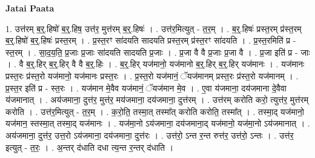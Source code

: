 \documentclass[17pt]{extarticle}
\begin{document}
\textbf{Jatai Paata} \newline

1. उत्त॑रम् ब॒र्॒.हिषो॑ ब॒र्॒.हिष॒ उत्त॑र॒ मुत्त॑रम् ब॒र्॒.हिषः॑ । . उत्त॑र॒मित्युत् - त॒र॒म् । . ब॒र्॒.हिषः॑ प्रस्त॒रम् प्र॑स्त॒रम् ब॒र्॒.हिषो॑ ब॒र्॒.हिषः॑ प्रस्त॒रम् । . प्र॒स्त॒रꣳ सा॑दयति सादयति प्रस्त॒रम् प्र॑स्त॒रꣳ सा॑दयति । . प्र॒स्त॒रमिति॑ प्र - स्त॒रम् । . सा॒द॒य॒ति॒ प्र॒जाः प्र॒जाः सा॑दयति सादयति प्र॒जाः । . प्र॒जा वै वै प्र॒जाः प्र॒जा वै । . प्र॒जा इति॑ प्र - जाः । . वै ब॒र्॒.हिर् ब॒र्॒.हिर् वै वै ब॒र्॒.हिः । . ब॒र्॒.हिर् यज॑मानो॒ यज॑मानो ब॒र्॒.हिर् ब॒र्॒.हिर् यज॑मानः । . यज॑मानः प्रस्त॒रः प्र॑स्त॒रो यज॑मानो॒ यज॑मानः प्रस्त॒रः । . प्र॒स्त॒रो यज॑मानं॒ ॅयज॑मानम् प्रस्त॒रः प्र॑स्त॒रो यज॑मानम् । . प्र॒स्त॒र इति॑ प्र - स्त॒रः । . यज॑मान मे॒वैव यज॑मानं॒ ॅयज॑मान मे॒व । . ए॒वा य॑जमाना॒ दय॑जमाना दे॒वैवा य॑जमानात् । . अय॑जमाना॒ दुत्त॑र॒ मुत्त॑र॒ मय॑जमाना॒ दय॑जमाना॒ दुत्त॑रम् । . उत्त॑रम् करोति करो॒ त्युत्त॑र॒ मुत्त॑रम् करोति । . उत्त॑र॒मित्युत् - त॒र॒म् । . क॒रो॒ति॒ तस्मा॒त् तस्मा᳚त् करोति करोति॒ तस्मा᳚त् । . तस्मा॒द् यज॑मानो॒ यज॑मान॒ स्तस्मा॒त् तस्मा॒द् यज॑मानः । . यज॑मा॒नो ऽय॑जमाना॒ दय॑जमाना॒द् यज॑मानो॒ यज॑मा॒नो ऽय॑जमानात् । . अय॑जमाना॒ दुत्त॑र॒ उत्त॒रो ऽय॑जमाना॒ दय॑जमाना॒ दुत्त॑रः । . उत्त॑रो॒ ऽन्त र॒न्त रुत्त॑र॒ उत्त॑रो॒ ऽन्तः । . उत्त॑र॒ इत्युत् - त॒रः॒ । . अ॒न्तर् द॑धाति दधा त्य॒न्त र॒न्तर् द॑धाति । \newline
\end{document}
